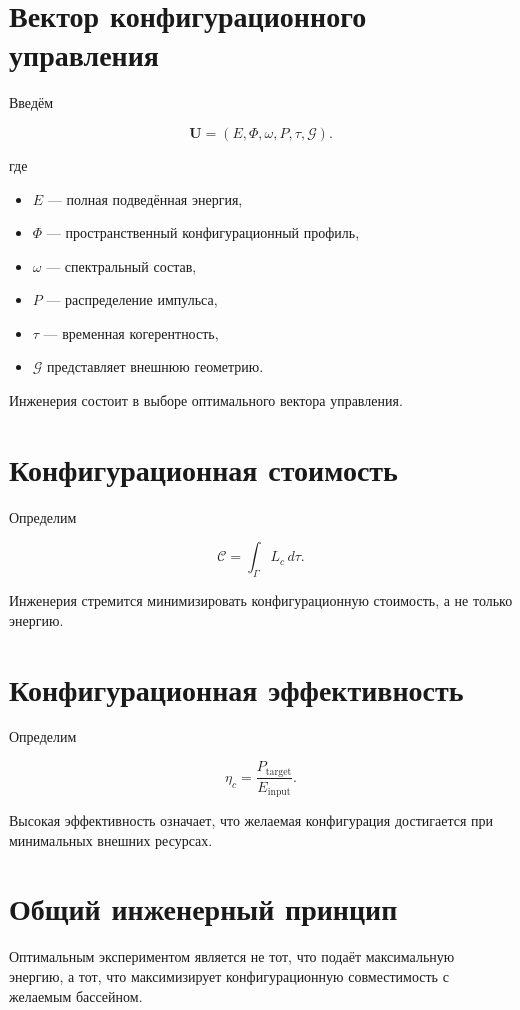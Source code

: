 \section{Вектор конфигурационного управления}

Введём

\[ \boxed{ \mathbf U = (E, \Phi, \omega, P, \tau, \mathcal G). } \]

где

\begin{itemize}
\item $E$ — полная подведённая энергия,
\item $\Phi$ — пространственный конфигурационный профиль,
\item $\omega$ — спектральный состав,
\item $P$ — распределение импульса,
\item $\tau$ — временная когерентность,
\item $\mathcal G$ представляет внешнюю геометрию.
\end{itemize}

Инженерия состоит в выборе оптимального вектора управления.

\section{Конфигурационная стоимость}

Определим

\[ \boxed{ \mathcal C = \int_\Gamma L_c \,d\tau. } \]

Инженерия стремится минимизировать конфигурационную стоимость, а не только энергию.

\section{Конфигурационная эффективность}

Определим

\[ \boxed{ \eta_c = \frac{P_{\mathrm{target}}} {E_{\mathrm{input}}}. } \]

Высокая эффективность означает, что желаемая конфигурация достигается при минимальных внешних ресурсах.

\section{Общий инженерный принцип}

Оптимальным экспериментом является не тот, что подаёт максимальную энергию, а тот, что максимизирует конфигурационную совместимость с желаемым бассейном.

